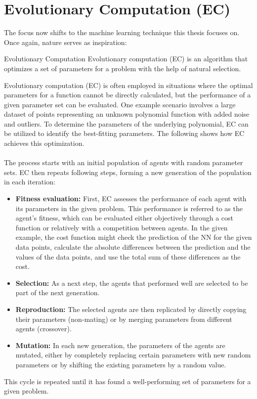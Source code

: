 \section{Evolutionary Computation (EC)}\label{sec:evolutionary-computation-(ec)-&-genetic-algorithms-(gas)}
The focus now shifts to the machine learning technique this thesis focuses on.
Once again, nature serves as inspiration:
\begin{mydef}{Evolutionary Computation}
    Evolutionary computation (EC) is an algorithm that optimizes a set of parameters for a problem with the help of natural selection.\cite{virtusa2024}
\end{mydef}
Evolutionary computation (EC) is often employed in situations where the optimal parameters for a function cannot be directly calculated, but the performance of a given parameter set can be evaluated.
One example scenario involves a large dataset of points representing an unknown polynomial function with added noise and outliers.
To determine the parameters of the underlying polynomial, EC can be utilized to identify the best-fitting parameters.
The following shows how EC achieves this optimization.
\\ \\
The process starts with an initial population of agents with random parameter sets.
EC then repeats following steps, forming a new generation of the population in each iteration\cite{Sathyabama20}:
\begin{itemize}
    \item \textbf{Fitness evaluation:} First, EC assesses the performance of each agent with its parameters in the given problem.
    This performance is referred to as the agent's fitness, which can be evaluated either objectively through a cost function or relatively with a competition between agents.
    In the given example, the cost function might check the prediction of the NN for the given data points, calculate the absolute differences between the prediction and the values of the data points, and use the total sum of these differences as the cost.
    \item \textbf{Selection:} As a next step, the agents that performed well are selected to be part of the next generation.
    \item \textbf{Reproduction:} The selected agents are then replicated by directly copying their parameters (non-mating) or by merging parameters from different agents (crossover).
    \item \textbf{Mutation:} In each new generation, the parameters of the agents are mutated, either by completely replacing certain parameters with new random parameters or by shifting the existing parameters by a random value.
\end{itemize}
This cycle is repeated until it has found a well-performing set of parameters for a given problem.


